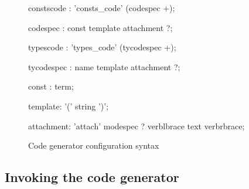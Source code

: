 \begin{figure}
\begin{rail}
constscode : 'consts_code' (codespec +);

codespec : const template attachment ?;

typescode : 'types_code' (tycodespec +);

tycodespec : name template attachment ?;

const : term;

template: '(' string ')';

attachment: 'attach' modespec ? verblbrace text verbrbrace;
\end{rail}
\caption{Code generator configuration syntax}
\label{fig:HOL:codegen-configuration}
\end{figure}

\subsection{Invoking the code generator}

